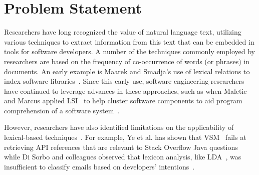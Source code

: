 

\clearpage

\section{Problem Statement}
\label{cp5:motivation}









Researchers have long recognized the value of natural language
text, utilizing various techniques to extract
information from this text that can be embedded in
tools for software developers.
A number of the techniques commonly employed by researchers are based on the
frequency of co-occurrence of words (or phrases) in documents. 
An early example is Maarek and Smadja's use of lexical relations to index
software libraries~\cite{maarek1989}. 
Since this early use, software engineering
researchers have continued to leverage advances in
these approaches, such as when 
Maletic and Marcus applied \acf{LSI}~\cite{deerwester1990LSI} to help cluster software components to aid
program comprehension of a software system~\cite{Marcus2003}.


However, researchers have also identified limitations on the applicability of lexical-based techniques~\cite{silva2019, Ye2016, Sorbo2015}. For example, Ye et al. has shown that \acs{VSM}~\cite{Salton1975vsm} 
fails at retrieving API references that are relevant to Stack Overflow Java questions~\cite{Ye2016} while
Di Sorbo and colleagues observed that lexicon analysis, like \acs{LDA}~\cite{blei2003latent}, was insufficient to classify 
emails based on developers' intentions~\cite{Sorbo2015}.








